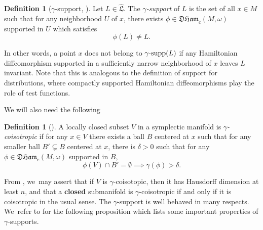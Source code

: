 \documentclass[10pt]{amsart}
\theoremstyle{definition}
\newtheorem{defn}[thm]{Definition}
\DeclareMathOperator{\gammasupp}{\gamma\textup{-supp}}
\newcommand{\DHam}{\mathfrak{DHam}}
\newcommand{\fL}{\mathfrak {L}}
\newcommand{\hatL}{\widehat{\fL}}
\begin{document}
\begin{defn}[$\gamma$-support, \cite{Viterbo-gammas}]\label{defgamma} Let $L\in \hatL$. The \emph{$\gamma$\nobreakdash-support} of $L$ is the set of all $x\in M$ such that for any neighborhood $U$ of $x$, there exists $\phi\in\DHam_c(M,\omega)$ supported in $U$ which satisfies
\[
\phi(L)\neq L.
\]
\end{defn}

In other words, a point $x$ does not belong to $\gammasupp(L)$ if any Hamiltonian diffeomorphism supported in a sufficiently narrow neighborhood of $x$ leaves $L$ invariant. Note that this is analogous to the definition of support for
distributions, where compactly supported Hamiltonian diffeomorphisms play the role of test functions.

We will also need the following
\begin{defn}[\cite{Usher-rigidity,Viterbo-gammas}]
A locally closed subset $V$ in a symplectic manifold is \emph{$\gamma$\nobreakdash-coisotropic} if for any $x\in V$ there exists a ball $B$ centered at $x$ such that for any smaller ball $B'\subsetneq B$ centered at $x$, there is $\delta>0$ such that for any $\phi\in\DHam_c(M,\omega)$ supported in $B$,\vspace*{-3pt}\enlargethispage{.5\baselineskip}
\[
\phi(V)\cap B'=\emptyset\implies \gamma(\phi)>\delta.
\]
\end{defn}
From \cite{Viterbo-gammas}, we~may assert that if $V$ is $\gamma$\nobreakdash-coisotopic, then it has Hausdorff dimension at least $n$, and that a {\bf closed} submanifold is $\gamma$\nobreakdash-coisotropic if and only if it is coisotropic in the usual sense.
The $\gamma$\nobreakdash-support is well behaved in many respects. We~refer to \cite{Viterbo-gammas} for the following proposition which lists some important properties of $\gamma$\nobreakdash-supports.
\end{document}
